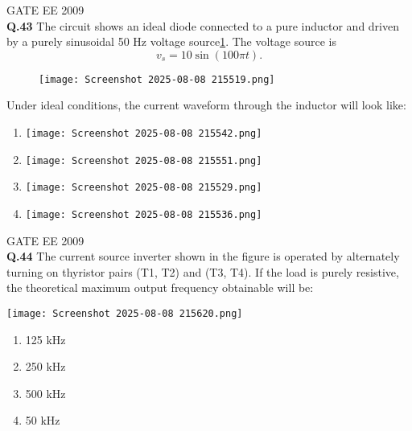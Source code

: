 \documentclass[12pt]{article}
\begin{document}
\vspace{1cm}

\hspace{10pt}
GATE EE 2009\\


\noindent\textbf{Q.43} The circuit shows an ideal diode connected to a pure inductor and driven by a purely sinusoidal 50 Hz voltage source\ref{fig:12}. The voltage source is 
\[
v_s = 10 \sin(100 \pi t).
\]
\begin{figure}[h]
    \centering
    \texttt{[image: Screenshot 2025-08-08 215519.png]}
\label{fig:12}
\end{figure}

Under ideal conditions, the current waveform through the inductor will look like:

\vspace{0.3cm}


\begin{enumerate}
        \item \texttt{[image: Screenshot 2025-08-08 215542.png]}
    \item \texttt{[image: Screenshot 2025-08-08 215551.png]} 
    \item \texttt{[image: Screenshot 2025-08-08 215529.png]} 
   \item  \texttt{[image: Screenshot 2025-08-08 215536.png]} 
\end{enumerate}

\hspace{10pt}
GATE EE 2009\\

\noindent\textbf{Q.44} The current source inverter shown in the figure is operated by alternately turning on thyristor pairs (T1, T2) and (T3, T4). If the load is purely resistive, the theoretical maximum output frequency obtainable will be:

\vspace{0.3cm}

\begin{center}
    \texttt{[image: Screenshot 2025-08-08 215620.png]}
\end{center}

\begin{enumerate}
    \item 125 kHz
    \item 250 kHz
    \item 500 kHz
    \item 50 kHz
\end{enumerate}
\end{document}
